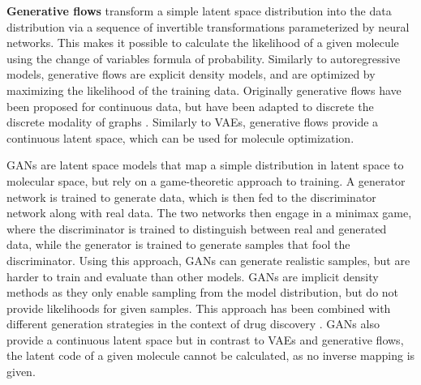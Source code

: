 \textbf{Generative flows} \citep{rezendeVariationalInferenceNormalizing2016} transform a simple
latent space distribution into the data distribution via a sequence of invertible transformations
parameterized by neural networks. This makes it possible to calculate the likelihood of a given
molecule using the change of variables formula of probability. Similarly to autoregressive models,
generative flows are explicit density models, and are optimized by maximizing the likelihood of the
training data. Originally generative flows have been proposed for continuous data, but have been
adapted to discrete the discrete modality of graphs
\citep{madhawaGraphNVPInvertibleFlow2019,satorrasEquivariantNormalizingFlows2022,shiGraphAFFlowbasedAutoregressive2020,kuznetsovMolGrowGraphNormalizing2021}.
Similarly to \acp{VAE}, generative flows provide a continuous latent space, which can be used for
molecule optimization.

\Acp{GAN} \citep{goodfellowGenerativeAdversarialNetworks2014} are latent space models that map a
simple distribution in latent space to molecular space, but rely on a game-theoretic approach to
training. A generator network is trained to generate data, which is then fed to the discriminator
network along with real data. The two networks then engage in a minimax game, where the
discriminator is trained to distinguish between real and generated data, while the generator is
trained to generate samples that fool the discriminator. Using this approach, \acp{GAN} can generate
realistic samples, but are harder to train and evaluate than other models. \Acp{GAN} are implicit
density methods as they only enable sampling from the model distribution, but do not provide
likelihoods for given samples. This approach has been combined with different generation strategies
in the context of drug discovery
\citep{decaoMolGANImplicitGenerative2018,kadurinDruGANAdvancedGenerative2017,guimaraesObjectiveReinforcedGenerativeAdversarial2017,mendez-lucioNovoGenerationHitlike2018,tangMolecularGenerativeAdversarial2024}.
\acp{GAN} also provide a continuous latent space but in contrast to \acp{VAE} and generative flows,
the latent code of a given molecule cannot be calculated, as no inverse mapping is given.

